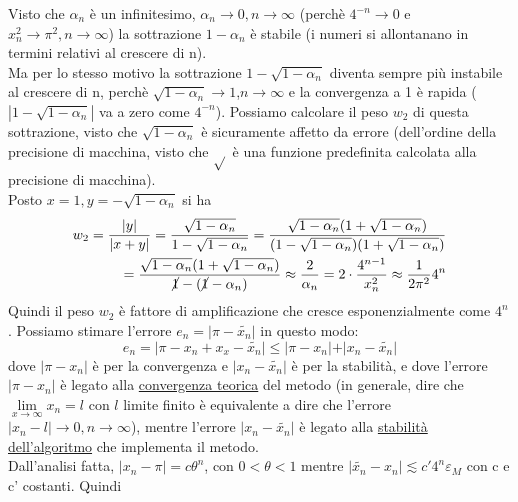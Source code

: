\documentclass[12pt]{article}
\begin{document}
Visto che $\alpha_n$ è un infinitesimo, $\alpha_n \rightarrow0, n\rightarrow\infty$ (perchè $4^{-n}\rightarrow0$ e $x^{2}_n\rightarrow\pi^2, n\rightarrow\infty$) la sottrazione $1-\alpha_n$ è stabile (i numeri si allontanano in termini relativi al crescere di n).\\ Ma per lo stesso motivo la sottrazione $1-\sqrt{1-\alpha_n}$ diventa sempre più instabile al crescere di n, perchè $\sqrt{1-\alpha_n}\rightarrow1$,$n\rightarrow\infty$ e la convergenza a 1 è rapida ($|1-\sqrt{1-\alpha_n}|$ va a zero come $4^{-n}$). Possiamo calcolare il peso $w_2$ di questa sottrazione,
visto che $\sqrt{1-\alpha_n}$ è sicuramente affetto da errore (dell'ordine della precisione di macchina, visto che $\sqrt{}$ è una funzione predefinita calcolata alla precisione di macchina).\\ Posto $x=1, y=-\sqrt{1-\alpha_n}$ si ha\\
\begin{equation}
    \begin{split}
        w_2=\frac{|y|}{|x+y|}=\frac{\sqrt{1-\alpha_n}}{1-\sqrt{1-\alpha_n}}
        =\frac{\sqrt{1-\alpha_n}(1+\sqrt{1-\alpha_n})}{(1-\sqrt{1-\alpha_n})(1+\sqrt{1-\alpha_n})} \\
        =\frac{\sqrt{1-\alpha_n}(1+\sqrt{1-\alpha_n})}{\cancel{1}-(\cancel{1}-\alpha_n)}
        \approx\frac{2}{\alpha_n}=2\cdot\frac{4^{n-1}}{x^{2}_n}\approx\frac{1}{2\pi^2}4^n
    \end{split}
\end{equation}
Quindi il peso $ w_{2} $ è fattore di amplificazione che cresce esponenzialmente come $ 4^{n} $. Possiamo stimare l'errore $ e_{n}=\vert \pi-\widetilde{x_{n}}\vert $ in questo modo:
\begin{equation}
     e_{n}=\vert \pi - x_{n}+x_{x}-\widetilde{x_{n}}\vert \leq \vert \pi - x_{n}\vert + \vert x_{n}-\widetilde{x_{n}}\vert
\end{equation}
dove $ \vert \pi - x_{n}\vert$ è per la convergenza e $\vert x_{n}-\widetilde{x_{n}}\vert$ è per la stabilità, e dove l'errore $\vert \pi - x_{n} \vert $ è legato alla \underline{convergenza teorica} del metodo (in generale, dire che $ \lim\limits_{x\to \infty} x_{n} = l $ con $l$ limite finito è equivalente a dire che l'errore $ \vert x_{n} - l \vert \rightarrow 0, n \rightarrow \infty $), mentre l'errore $ \vert x_{n}-\widetilde{x_{n}}\vert $ è legato alla \underline{stabilità dell'algoritmo} che implementa il metodo. \\
Dall'analisi fatta, $\vert x_{n} - \pi \vert = c\theta^{n} $, con $0<\theta<1$ mentre $\vert \widetilde{x_{n}} - x_{n} \vert \lesssim c'4^{n}\varepsilon_{M}$ con c e c' costanti. Quindi 
\end{document}
